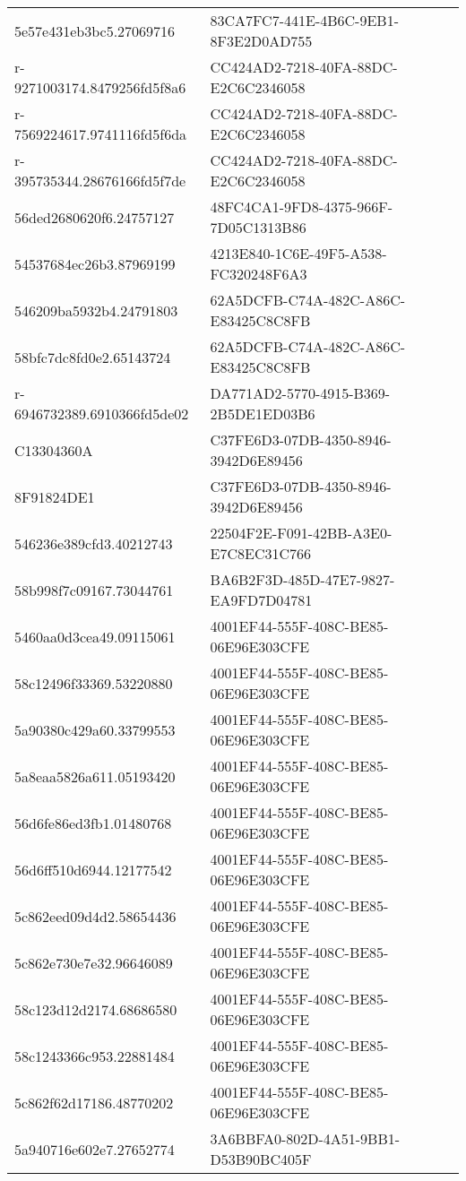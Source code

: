 \begin{tabular}{ll}
5e57e431eb3bc5.27069716 & 83CA7FC7-441E-4B6C-9EB1-8F3E2D0AD755 \\
r-9271003174.8479256fd5f8a6 & CC424AD2-7218-40FA-88DC-E2C6C2346058 \\
r-7569224617.9741116fd5f6da & CC424AD2-7218-40FA-88DC-E2C6C2346058 \\
r-395735344.28676166fd5f7de & CC424AD2-7218-40FA-88DC-E2C6C2346058 \\
56ded2680620f6.24757127 & 48FC4CA1-9FD8-4375-966F-7D05C1313B86 \\
54537684ec26b3.87969199 & 4213E840-1C6E-49F5-A538-FC320248F6A3 \\
546209ba5932b4.24791803 & 62A5DCFB-C74A-482C-A86C-E83425C8C8FB \\
58bfc7dc8fd0e2.65143724 & 62A5DCFB-C74A-482C-A86C-E83425C8C8FB \\
r-6946732389.6910366fd5de02 & DA771AD2-5770-4915-B369-2B5DE1ED03B6 \\
C13304360A & C37FE6D3-07DB-4350-8946-3942D6E89456 \\
8F91824DE1 & C37FE6D3-07DB-4350-8946-3942D6E89456 \\
546236e389cfd3.40212743 & 22504F2E-F091-42BB-A3E0-E7C8EC31C766 \\
58b998f7c09167.73044761 & BA6B2F3D-485D-47E7-9827-EA9FD7D04781 \\
5460aa0d3cea49.09115061 & 4001EF44-555F-408C-BE85-06E96E303CFE \\
58c12496f33369.53220880 & 4001EF44-555F-408C-BE85-06E96E303CFE \\
5a90380c429a60.33799553 & 4001EF44-555F-408C-BE85-06E96E303CFE \\
5a8eaa5826a611.05193420 & 4001EF44-555F-408C-BE85-06E96E303CFE \\
56d6fe86ed3fb1.01480768 & 4001EF44-555F-408C-BE85-06E96E303CFE \\
56d6ff510d6944.12177542 & 4001EF44-555F-408C-BE85-06E96E303CFE \\
5c862eed09d4d2.58654436 & 4001EF44-555F-408C-BE85-06E96E303CFE \\
5c862e730e7e32.96646089 & 4001EF44-555F-408C-BE85-06E96E303CFE \\
58c123d12d2174.68686580 & 4001EF44-555F-408C-BE85-06E96E303CFE \\
58c1243366c953.22881484 & 4001EF44-555F-408C-BE85-06E96E303CFE \\
5c862f62d17186.48770202 & 4001EF44-555F-408C-BE85-06E96E303CFE \\
5a940716e602e7.27652774 & 3A6BBFA0-802D-4A51-9BB1-D53B90BC405F \\

\end{tabular}
